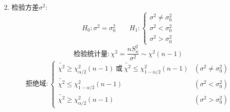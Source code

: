 \begin{enumerate}
\begin{displaymath}
  \end{displaymath}
  \item
  检验方差$\sigma^2$:
  \begin{displaymath}
    H_0:\sigma^2=\sigma_0^2 \qquad
    H_1: \begin{cases}
      \sigma^2\neq\sigma_0^2 \\
      \sigma^2 < \sigma_0^2 \\
      \sigma^2 > \sigma_0^2
    \end{cases}
  \end{displaymath}
  \begin{displaymath}
    \text{检验统计量}: \chi^2=\frac{nS_n^2}{\sigma^2}\sim \chi^2(n-1)
  \end{displaymath}
  \begin{displaymath}
    \text{拒绝域}: \begin{cases}
      \widetilde{\chi^2} \ge \chi^2_{\alpha/2}(n-1)
        \ \text{或}\ \widetilde{\chi^2} \le \chi^2_{1-\alpha/2}(n-1)
        & (\sigma^2\neq\sigma_0^2) \\
      \widetilde{\chi^2} \le \chi^2_{1-\alpha/2}(n-1)
        & (\sigma^2 < \sigma_0^2) \\
      \widetilde{\chi^2} \ge \chi^2_{\alpha/2}(n-1)
        & (\sigma^2 > \sigma_0^2)
    \end{cases}
  \end{displaymath}
\end{enumerate}

